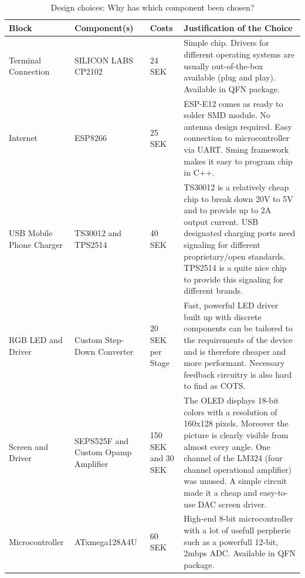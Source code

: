 \begin{table}[H]
	\centering 
	\begin{tabular}{p{} p{} p{} 
		p{} } 
		\textbf{Block}           &
		\textbf{Component(s)}      &
		\textbf{Costs} 
		& \textbf{Justification of the
		Choice}
		\\\hline
		Terminal Connection      & SILICON LABS CP2102        & 24 SEK
		& Simple chip. Drivers for different operating systems are
		usually out-of-the-box available (plug and play). Available in
		QFN package.
		\\
		Internet                 & ESP8266                    & 25 SEK
		& ESP-E12 comes as ready to solder SMD module. No antenna design
		required. Easy connection to microcontroller via UART. Sming
		framework makes it easy to program chip in C++.
		\\
		USB Mobile Phone Charger & TS30012 and TPS2514        & 40 SEK
		& TS30012 is a relatively cheap chip to break down 20V to 5V and
		to provide up to 2A output current.  USB designated charging
		ports need signaling for different proprietary/open standards.
		TPS2514 is a quite nice chip to provide this signaling for
		different brands. \\
		RGB LED and Driver       & Custom Step-Down Converter & 20 SEK
		per Stage         & Fast, powerful LED driver built up with
		discrete components can be tailored to the requirements of the
		device and is therefore cheaper and more performant. Necessary
		feedback circuitry is also hard to find as COTS.
		\\
		Screen and Driver        & SEPS525F and Custom Opamp Amplifier &
		150 SEK and 30 SEK & The OLED displays 18-bit colors with a
		resolution of 160x128 pixels. Moreover the picture is clearly
		visible from almost every angle. One channel of the LM324 (four
		channel operational amplifier) was unused. A simple circuit made
		it a cheap and easy-to-use DAC screen driver.    \\ 
		Microcontroller & ATxmega128A4U & 60 SEK & High-end 8-bit
		microcontroller with a lot of usefull perpherie such as a
		powerfull 12-bit, 2mbps ADC. Available in QFN package.	\\
		\hline
	\end{tabular}
	\caption{Design choices: Why has which component been chosen?}
	\label{tab:design_choices}
\end{table}
